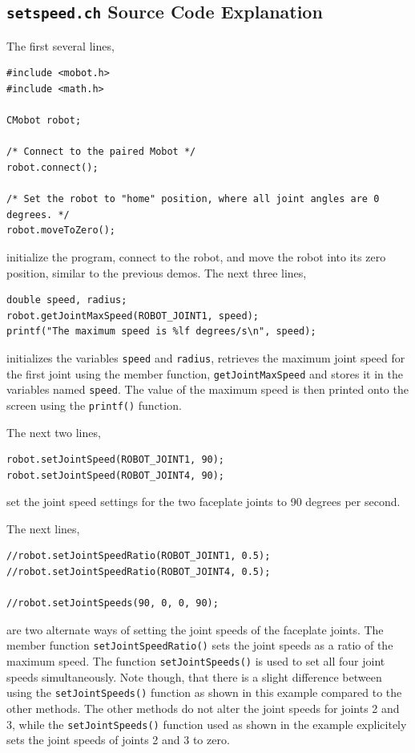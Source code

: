 \documentclass{article}
\begin{document}
\subsection{\texttt{setspeed.ch} Source Code Explanation}
The first several lines,
\begin{verbatim}
#include <mobot.h>
#include <math.h>

CMobot robot;

/* Connect to the paired Mobot */
robot.connect();

/* Set the robot to "home" position, where all joint angles are 0 degrees. */
robot.moveToZero();
\end{verbatim}
initialize the program, connect to the robot, and move the robot into its zero position,
similar to the previous demos. The next three lines,
\begin{verbatim}
double speed, radius;
robot.getJointMaxSpeed(ROBOT_JOINT1, speed);
printf("The maximum speed is %lf degrees/s\n", speed);
\end{verbatim}
initializes the variables \texttt{speed} and \texttt{radius},
retrieves the maximum joint speed for the first joint using the member function,
\texttt{getJointMaxSpeed} and stores it in the variables named \texttt{speed}.
The value of the maximum speed is then printed onto the screen using the \texttt{printf()}
function.

The next two lines,
\begin{verbatim}
robot.setJointSpeed(ROBOT_JOINT1, 90);
robot.setJointSpeed(ROBOT_JOINT4, 90);
\end{verbatim}
set the joint speed settings for the two faceplate joints to 90 degrees per second.

The next lines, 
\begin{verbatim}
//robot.setJointSpeedRatio(ROBOT_JOINT1, 0.5);
//robot.setJointSpeedRatio(ROBOT_JOINT4, 0.5);

//robot.setJointSpeeds(90, 0, 0, 90);
\end{verbatim}
are two alternate ways of setting the joint speeds of the faceplate joints. 
The member function \texttt{setJointSpeedRatio()} sets the joint speeds as a ratio of the 
maximum speed. The function \texttt{setJointSpeeds()} is used to set all four
joint speeds simultaneously. Note though, that there is a slight difference between
using the \texttt{setJointSpeeds()} function as shown in this example compared to the
other methods. The other methods do not alter the joint speeds for joints 2 and 3, while
the \texttt{setJointSpeeds()} function used as shown in the example explicitely sets
the joint speeds of joints 2 and 3 to zero. 
\end{document}
